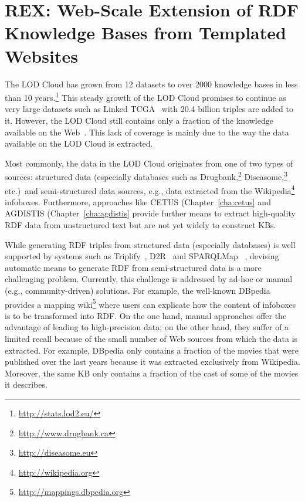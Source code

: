 \chapter{REX: Web-Scale Extension of RDF Knowledge Bases from Templated Websites}
\label{cha:rex}



The \ac{LOD} Cloud has grown from 12 datasets to over 2000 knowledge bases in less than 10 years.\footnote{\url{http://stats.lod2.eu/}}
This steady growth of the \ac{LOD} Cloud promises to continue as very large datasets such as  Linked TCGA~\cite{SAL+13a} with 20.4 billion triples are added to it. 
However, the \ac{LOD} Cloud still contains only a fraction of the knowledge available on the Web~\cite{GER+13}. 
This lack of coverage is mainly due to the way the data available on the \ac{LOD} Cloud is extracted. 

Most commonly, the data in the \ac{LOD} Cloud originates from one of two types of sources: structured data (especially databases such as Drugbank,\footnote{\url{http://www.drugbank.ca}} Diseasome,\footnote{\url{http://diseasome.eu}} etc.)~and semi-structured data sources, e.g., data extracted from the Wikipedia\footnote{\url{http://wikipedia.org}} infoboxes. 
Furthermore, approaches like CETUS (Chapter~\ref{cha:cetus} and  AGDISTIS (Chapter~\ref{cha:agdistis} provide further means to extract high-quality \ac{RDF} data from unstructured text but are not yet widely to construct \ac{KB}s.

While generating \ac{RDF} triples from structured data (especially databases) is well supported by systems such as Triplify~\cite{triplify_www}, D2R~\cite{Bizer04} and SPARQLMap~\cite{unbehauen-jist-2012-sparqlmap}
, devising automatic means to generate \ac{RDF} from semi-structured data is a more challenging  problem. 
Currently, this challenge is addressed by ad-hoc or manual (e.g., community-driven) solutions. 
For example, the well-known DBpedia~\cite{dbpedia-swj} provides a mapping wiki\footnote{\url{http://mappings.dbpedia.org}} where users can explicate how the content of infoboxes is to be transformed into \ac{RDF}. 
On the one hand, manual approaches offer the advantage of leading to high-precision data; on the other hand, they suffer of a limited recall because of the small number of Web sources from which the data is extracted. 
For example, DBpedia only contains a fraction of the movies that were published over the last years because it was extracted exclusively from Wikipedia.
Moreover, the same  \ac{KB} only contains a fraction of the cast of some of the movies it describes.

